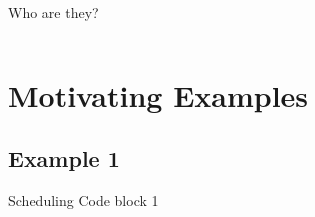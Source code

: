 \documentclass[notes xcolor=dvipsnames]{beamer}
\begin{document}
\begin{frame}{Who are they?}
\begin{columns}
\begin{column}[]{0.3\textwidth}
            \end{column}


        \end{columns}
    
    \end{frame}

    \section{Motivating Examples}
    
    \subsection{Example 1}
    \begin{frame}{Scheduling Code block 1}

        \begin{columns}
            
            \begin{column}{0.5\textwidth}
                \begin{figure}
                \end{figure}
                
            \end{column}

            \begin{column}{0.5\textwidth}

                \begin{figure}
                \end{figure}


\end{column}
\end{columns}
\end{frame}
\end{document}
